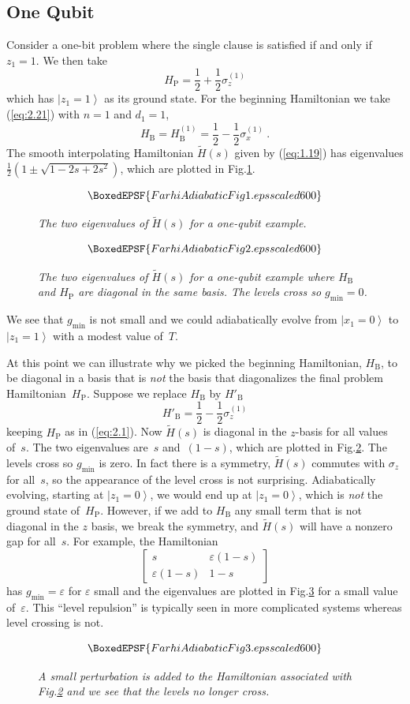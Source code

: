 \documentclass[twoside]{article}
\newcommand{\half}{{\textstyle{\frac12}}}
\newcommand{\ket}[1]{\left|#1\right\rangle}
\newcommand{\numEq}[2]{\begin{equation}
   \label{eq:#1}
   #2\end{equation}}
\newcommand{\refEq}[1]{(\ref{eq:#1})}
\newcommand{\numFig}[3]{\begin{figure}[ht]
 $$\BoxedEPSF{#3}$$
    \caption{#2}\label{fig:#1}
   \end{figure}}
\newcommand{\refFig}[1]{Fig.\thinspace\ref{fig:#1}}
\newcommand{\eps}{\epsilon}
\newcommand{\rP}{{\mathrm{P}}}
\newcommand{\rB}{{\mathrm{B}}}
\newcommand{\gm}{g_{\min}}
\newcommand{\ifff}{if and only if}
\let\epsilon\varepsilon
\let\tilde\widetilde
\numberwithin{equation}{section}
\begin{document}
\subsection{One Qubit} Consider a one-bit problem where the single clause
is satisfied \ifff\
$z_1=1$. We then take
\numEq{2.1}{ H_\rP = \half + \half \sigma_z^{(1)} } which has
$\ket{z_1=1}$ as its ground state. For the beginning Hamiltonian we take
\refEq{2.21} with $n=1$ and $d_1=1$,
\numEq{2.2}{ H_\rB =H_\rB^{(1)} = \half - \half \sigma_x^{(1)}\ . } The
smooth interpolating Hamiltonian $\tilde H(s)$ given by \refEq{1.19} has
eigenvalues $\half(1\pm\sqrt{1-2s+2s^2})$,  which are plotted in
\refFig{1}. 
\numFig{1}{\slshape  The two eigenvalues of $\tilde{H}(s)$ for a one-qubit
example.}{FarhiAdiabaticFig1.eps scaled 600}
\numFig{2}{\slshape  The two eigenvalues of $\tilde H(s)$ for a one-qubit
example where $H_\rB$ and $H_\rP$ are diagonal in the same basis.  The
levels cross so $\gm=0$.}{FarhiAdiabaticFig2.eps scaled 600}
  We see that $\gm$ is not
small and we could adiabatically evolve from $\ket{x_1=0}$ to
$\ket{z_1=1}$ with a modest value of~$T$.


At this point we can illustrate why we picked the beginning Hamiltonian,
$H_\rB$, to be diagonal in a basis that is \emph{not} the basis that
diagonalizes the final problem Hamiltonian~$H_\rP$. Suppose we replace
$H_\rB$ by $H'_\rB$
\numEq{2.3}{ H'_\rB = \half-\half \sigma_z^{(1)} } keeping $H_\rP$ as in
\refEq{2.1}. Now   $\tilde H(s)$ is diagonal in the
$z$-basis for all values of~$s$.  The two eigenvalues  are~$s$ and~$(1-s)$,
which are plotted in 
\refFig{2}. 
  The levels
cross so
$\gm$ is zero.  In fact there is a symmetry, $\tilde H(s)$ commutes with
$\sigma_z$ for all~$s$, so the appearance of the level cross is not
surprising.  Adiabatically evolving, starting at
$\ket{z_1=0}$, we would end up at $\ket{z_1=0}$, which is \emph{not} the
ground state of~$H_\rP$. However, if we add to $H_\rB$ any small term
that is not diagonal in the $z$ basis, we break the symmetry, and $\tilde
H(s)$ will have a nonzero gap for all~$s$. For example, the Hamiltonian
\numEq{2.4}{
\begin{bmatrix} s & {\eps}(1-s)\\[.5ex]  {\eps}(1-s) & 1-s\end{bmatrix} }
has
$\gm=\eps$ for $\eps$ small and the eigenvalues are plotted in \refFig{3}
for a small value of~$\eps$. 
This ``level repulsion'' is
typically seen in more complicated systems whereas level crossing is not. 

\numFig{3}{\slshape  A small perturbation is added to the Hamiltonian
associated with \refFig2 and we see that the levels no longer
cross.}{FarhiAdiabaticFig3.eps scaled 600} 
\end{document}
